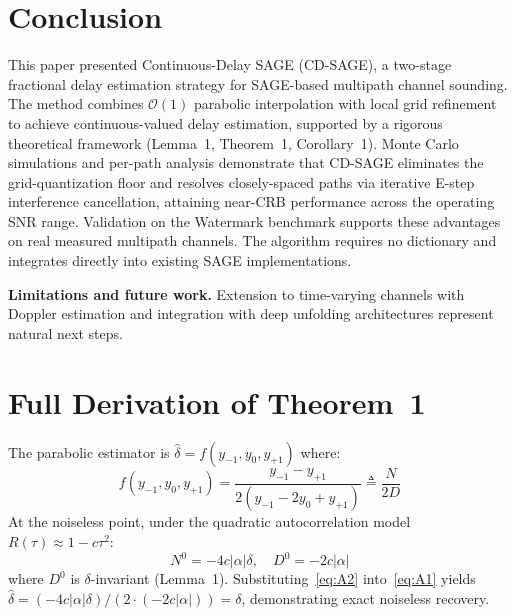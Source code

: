 \documentclass[a4paper,fleqn]{cas-dc}
\newcommand{\bigO}{\mathcal{O}}
\begin{document}
\section{Conclusion}
\label{sec:conclusion}

This paper presented Continuous-Delay SAGE (CD-SAGE), a two-stage fractional delay estimation strategy for SAGE-based multipath channel sounding. The method combines $\bigO(1)$ parabolic interpolation with local grid refinement to achieve continuous-valued delay estimation, supported by a rigorous theoretical framework (Lemma~1, Theorem~1, Corollary~1). Monte Carlo simulations and per-path analysis demonstrate that CD-SAGE eliminates the grid-quantization floor and resolves closely-spaced paths via iterative E-step interference cancellation, attaining near-CRB performance across the operating SNR range. Validation on the Watermark benchmark supports these advantages on real measured multipath channels. The algorithm requires no dictionary and integrates directly into existing SAGE implementations.

\textbf{Limitations and future work.} Extension to time-varying channels with Doppler estimation and integration with deep unfolding architectures represent natural next steps.

\appendix
\section{Full Derivation of Theorem~1}
\label{app:theorem1}

The parabolic estimator is $\hat{\delta} = f(y_{-1}, y_0, y_{+1})$ where:
\begin{equation}
f(y_{-1}, y_0, y_{+1}) = \frac{y_{-1} - y_{+1}}{2(y_{-1} - 2y_0 + y_{+1})} \triangleq \frac{N}{2D}
\label{eq:A1}
\end{equation}
At the noiseless point, under the quadratic autocorrelation model $R(\tau) \approx 1 - c\tau^2$:
\begin{equation}
N^0 = -4c|\alpha|\delta, \quad D^0 = -2c|\alpha|
\label{eq:A2}
\end{equation}
where $D^0$ is $\delta$-invariant (Lemma~1). Substituting~\eqref{eq:A2} into~\eqref{eq:A1} yields $\hat{\delta} = (-4c|\alpha|\delta) / (2 \cdot (-2c|\alpha|)) = \delta$, demonstrating exact noiseless recovery.
\end{document}
